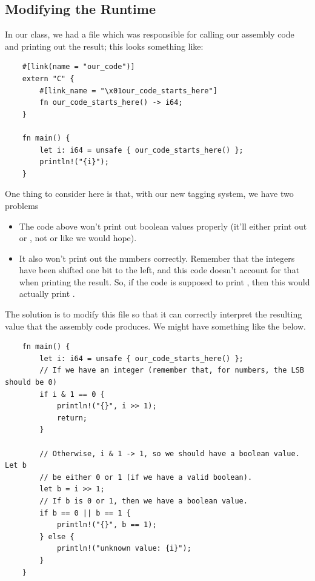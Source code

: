 \subsection{Modifying the Runtime}
In our class, we had a  file which was responsible for calling our assembly code and printing out the result; this looks something like:
\begin{verbatim}
    #[link(name = "our_code")]
    extern "C" {
        #[link_name = "\x01our_code_starts_here"]
        fn our_code_starts_here() -> i64;
    }
    
    fn main() {
        let i: i64 = unsafe { our_code_starts_here() };
        println!("{i}");
    }\end{verbatim}
One thing to consider here is that, with our new tagging system, we have two problems
\begin{itemize}
    \item The code above won't print out boolean values properly (it'll either print out  or , not  or  like we would hope).
    \item It also won't print out the numbers correctly. Remember that the integers have been shifted one bit to the left, and this code doesn't account for that when printing the result. So, if the code is supposed to print , then this would actually print . 
\end{itemize}
The solution is to modify this file so that it can correctly interpret the resulting value that the assembly code produces. We might have something like the below.
\begin{verbatim}
    fn main() {
        let i: i64 = unsafe { our_code_starts_here() };
        // If we have an integer (remember that, for numbers, the LSB should be 0)
        if i & 1 == 0 {
            println!("{}", i >> 1);
            return;
        }

        // Otherwise, i & 1 -> 1, so we should have a boolean value. Let b 
        // be either 0 or 1 (if we have a valid boolean).
        let b = i >> 1;
        // If b is 0 or 1, then we have a boolean value.
        if b == 0 || b == 1 {
            println!("{}", b == 1);
        } else {
            println!("unknown value: {i}");
        }
    }\end{verbatim}

